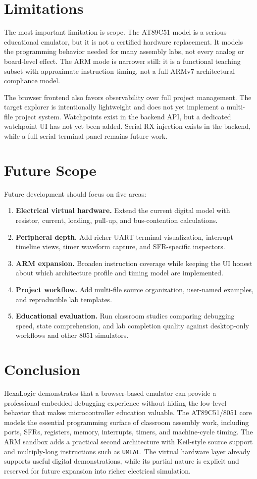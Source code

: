 \documentclass[conference]{IEEEtran}
\begin{document}
\section{Limitations}
The most important limitation is scope. The AT89C51 model is a serious educational emulator, but it is not a certified hardware replacement. It models the programming behavior needed for many assembly labs, not every analog or board-level effect. The ARM mode is narrower still: it is a functional teaching subset with approximate instruction timing, not a full ARMv7 architectural compliance model.

The browser frontend also favors observability over full project management. The target explorer is intentionally lightweight and does not yet implement a multi-file project system. Watchpoints exist in the backend API, but a dedicated watchpoint UI has not yet been added. Serial RX injection exists in the backend, while a full serial terminal panel remains future work.

\section{Future Scope}
Future development should focus on five areas:

\begin{enumerate}
\item \textbf{Electrical virtual hardware.} Extend the current digital model with resistor, current, loading, pull-up, and bus-contention calculations.
\item \textbf{Peripheral depth.} Add richer UART terminal visualization, interrupt timeline views, timer waveform capture, and SFR-specific inspectors.
\item \textbf{ARM expansion.} Broaden instruction coverage while keeping the UI honest about which architecture profile and timing model are implemented.
\item \textbf{Project workflow.} Add multi-file source organization, user-named examples, and reproducible lab templates.
\item \textbf{Educational evaluation.} Run classroom studies comparing debugging speed, state comprehension, and lab completion quality against desktop-only workflows and other 8051 simulators.
\end{enumerate}

\section{Conclusion}
HexaLogic demonstrates that a browser-based emulator can provide a professional embedded debugging experience without hiding the low-level behavior that makes microcontroller education valuable. The AT89C51/8051 core models the essential programming surface of classroom assembly work, including ports, SFRs, registers, memory, interrupts, timers, and machine-cycle timing. The ARM sandbox adds a practical second architecture with Keil-style source support and multiply-long instructions such as \texttt{UMLAL}. The virtual hardware layer already supports useful digital demonstrations, while its partial nature is explicit and reserved for future expansion into richer electrical simulation.
\end{document}

